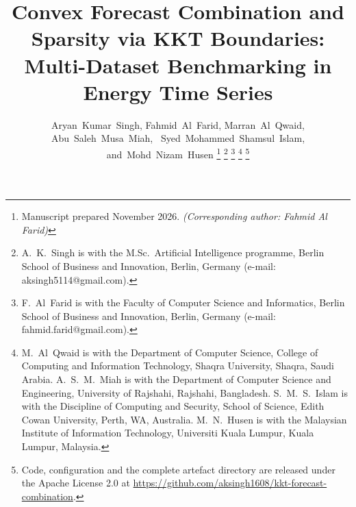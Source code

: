 \documentclass[journal]{IEEEtran}
\begin{document}
\title{Convex Forecast Combination and Sparsity via KKT Boundaries: Multi-Dataset Benchmarking in Energy Time Series}
\author{Aryan~Kumar~Singh,
        Fahmid~Al~Farid,
        Marran~Al~Qwaid,
        Abu~Saleh~Musa~Miah,~
        Syed~Mohammed~Shamsul~Islam,
        and~Mohd~Nizam~Husen%
\thanks{Manuscript prepared November 2026. \textit{(Corresponding author: Fahmid Al Farid)}}%
\thanks{A.~K.~Singh is with the M.Sc.\ Artificial Intelligence programme, Berlin School of Business and Innovation, Berlin, Germany (e-mail: aksingh5114@gmail.com).}%
\thanks{F.~Al~Farid is with the Faculty of Computer Science and Informatics, Berlin School of Business and Innovation, Berlin, Germany (e-mail: fahmid.farid@gmail.com).}%
\thanks{M.~Al~Qwaid is with the Department of Computer Science, College of Computing and Information Technology, Shaqra University, Shaqra, Saudi Arabia. A.~S.~M.~Miah is with the Department of Computer Science and Engineering, University of Rajshahi, Rajshahi, Bangladesh. S.~M.~S.~Islam is with the Discipline of Computing and Security, School of Science, Edith Cowan University, Perth, WA, Australia. M.~N.~Husen is with the Malaysian Institute of Information Technology, Universiti Kuala Lumpur, Kuala Lumpur, Malaysia.}%
\thanks{Code, configuration and the complete artefact directory are released under the Apache License 2.0 at \protect\url{https://github.com/aksingh1608/kkt-forecast-combination}.}}
\maketitle
\end{document}
